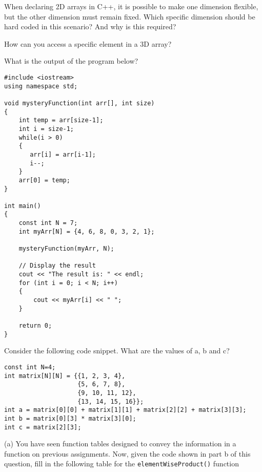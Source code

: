 \begin{problem}
    When declaring 2D arrays in C++, it is possible to make one dimension flexible, but the other dimension must remain fixed. Which specific dimension should be hard coded in this scenario? And why is this required?
\end{problem}

\begin{problem}
    How can you access a specific element in a 3D array?
\end{problem}

\begin{problem}
    What is the output of the program below?

\begin{verbatim}
#include <iostream>
using namespace std;

void mysteryFunction(int arr[], int size)
{
    int temp = arr[size-1];
    int i = size-1;
    while(i > 0)
    {
       arr[i] = arr[i-1];
       i--;
    }
    arr[0] = temp;
}

int main() 
{
    const int N = 7;
    int myArr[N] = {4, 6, 8, 0, 3, 2, 1};

    mysteryFunction(myArr, N);

    // Display the result
    cout << "The result is: " << endl;
    for (int i = 0; i < N; i++) 
    {
        cout << myArr[i] << " ";
    }

    return 0;
}
\end{verbatim}
\end{problem}

\begin{problem}
    Consider the following code snippet. What are the values of a, b and c?

\begin{verbatim}
const int N=4;
int matrix[N][N] = {{1, 2, 3, 4}, 
                    {5, 6, 7, 8}, 
                    {9, 10, 11, 12}, 
                    {13, 14, 15, 16}};
int a = matrix[0][0] + matrix[1][1] + matrix[2][2] + matrix[3][3];
int b = matrix[0][3] * matrix[3][0];
int c = matrix[2][3];
\end{verbatim}
\end{problem}

\begin{problem}
    (a) You have seen function tables designed to convey the information in a function on previous assignments. Now, given the code shown in part b of this question, fill in the following table for the \texttt{elementWiseProduct()} function
\end{problem}

